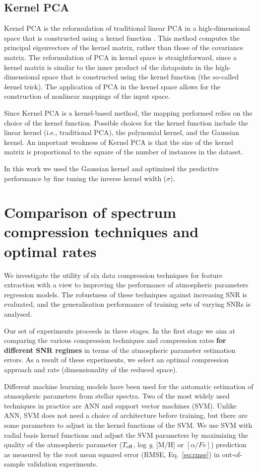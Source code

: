\documentclass[a4paper,fleqn,usenatbib]{mnras}
\begin{document}
{\subsection{Kernel PCA}

Kernel PCA is the reformulation of traditional linear PCA in a
high-dimensional space that is constructed using a kernel function
\citep{sholkopf:98}. This method computes the principal eigenvectors
of the kernel matrix, rather than those of the covariance matrix. The
reformulation of PCA in kernel space is straightforward, since a
kernel matrix is similar to the inner product of the datapoints in the
high-dimensional space that is constructed using the kernel function
(the so-called {\textit kernel trick}). The application of PCA in the
kernel space allows for the construction of nonlinear mappings of the
input space.

Since Kernel PCA is a kernel-based method, the mapping performed
relies on the choice of the kernel function. Possible choices for the
kernel function include the linear kernel (i.e., traditional PCA), the
polynomial kernel, and the Gaussian kernel. An important weakness of
Kernel PCA is that the size of the kernel matrix is proportional to
the square of the number of instances in the dataset.

In this work we used the Gaussian kernel and optimized the predictive
performance by fine tuning the inverse kernel width ($\sigma$). 

\section{Comparison of spectrum compression techniques and optimal rates}
\label{sec:comparison1}

We investigate the utility of six data compression techniques
for feature extraction with a view to improving the performance of
atmospheric parameters regression models. The robustness of these
techniques against increasing SNR is evaluated, and the generalisation
performance of training sets of varying SNRs is analysed.

Our set of experiments proceeds in three stages. In the first stage we
aim at comparing the various compression techniques and compression
rates {\bf for different SNR regimes} in terms of the atmospheric 
parameter estimation errors. As a result of these experiments, we select 
an optimal compression approach and rate (dimensionality of the reduced 
space).

Different machine learning models have been used for the automatic
estimation of atmospheric parameters from stellar spectra. Two of the
most widely used techniques in practice are ANN and support vector 
machines (SVM). Unlike ANN, SVM does not need
a choice of architecture before training, but there are some
parameters to adjust in the kernel functions of the SVM. We use SVM
with radial basis kernel functions and adjust the SVM parameters by
maximizing the quality of the atmospheric parameter ($T_{\rm eff}$,
log \textit{g}, [M/H] or $\left[ \alpha/Fe \right]$) prediction as 
measured by the root mean squared error (RMSE, Eq.~\ref{eq:rmse}) 
in out-of-sample validation experiments.

}
\end{document}
